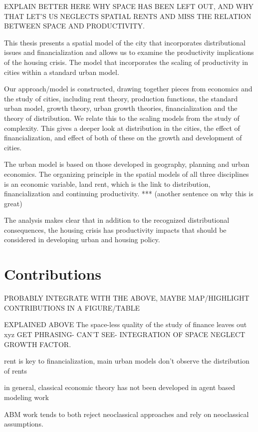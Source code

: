 EXPLAIN BETTER HERE WHY SPACE HAS BEEN LEFT OUT, AND WHY THAT LET'S US NEGLECTS SPATIAL RENTS AND MISS THE RELATION BETWEEN SPACE AND PRODUCTIVITY.

This thesis presents a spatial model of the city that incorporates distributional issues and financialization and allows us to examine the productivity implications of the housing crisis. The model that incorporates the scaling of productivity in cities within a standard urban model. 

Our approach/model is constructed, drawing together pieces from %
economics and the study of cities, including rent theory, production functions, the standard urban model, growth theory, urban growth theories, financialization and the theory of distribution.
We relate this to the scaling models from the study of complexity. This gives a deeper look at distribution in the cities, the effect of financialization, and effect of both of these on the growth and development of cities. 

The urban model is based on those developed in geography, planning and urban economics. The organizing principle in  the spatial models of all three disciplines is an economic variable, land rent, which is the link to distribution, financialization and continuing productivity. *** (another sentence on why this is great)

The analysis makes clear that in addition to the recognized distributional consequences, the housing crisis has productivity impacts that should be considered in developing urban and housing policy. 


\section{Contributions}

PROBABLY INTEGRATE WITH THE ABOVE, MAYBE MAP/HIGHLIGHT CONTRIBUTIONS IN A FIGURE/TABLE

EXPLAINED ABOVE The space-less quality of the study of finance leaves out xyz GET PHRASING- CAN'T SEE- INTEGRATION OF SPACE NEGLECT GROWTH FACTOR. 

rent is key to financialization, main urban models don't observe the distribution of rents

in general, classical economic theory has not been developed in agent based modeling work

ABM work tends to both reject neoclassical approaches and rely on neoclassical assumptions.

